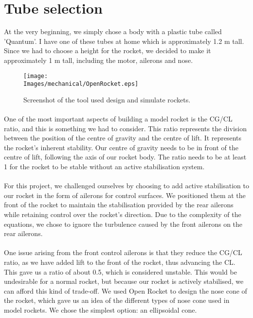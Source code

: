 \section{Tube selection}
At the very beginning, we simply chose a body with a plastic tube called 'Quantum'.
I have one of these tubes at home which is approximately 1.2 m tall. Since we had
to choose a height for the rocket, we decided to make it approximately 1 m tall,
including the motor, ailerons and nose.

\begin{figure}[!hbt]
    \centering
    \texttt{[image: \\Images/mechanical/OpenRocket.eps]}
    \caption{Screenshot of the tool used design and simulate rockets.}
\end{figure}
\FloatBarrier

\paragraph{}
One of the most important aspects of building a model rocket is the CG/CL ratio,
and this is something we had to consider. This ratio represents the division between
the position of the centre of gravity and the centre of lift. It represents the
rocket's inherent stability. Our centre of gravity needs to be in front of the
centre of lift, following the axis of our rocket body. The ratio needs to be at
least 1 for the rocket to be stable without an active stabilisation system.

\paragraph{}
For this project, we challenged ourselves by choosing to add active stabilisation
to our rocket in the form of ailerons for control surfaces. We positioned them at
the front of the rocket to maintain the stabilisation provided by the rear ailerons
while retaining control over the rocket's direction. Due to the complexity of the
equations, we chose to ignore the turbulence caused by the front ailerons on the
rear ailerons.

\paragraph{}
One issue arising from the front control ailerons is that they reduce the CG/CL
ratio, as we have added lift to the front of the rocket, thus advancing the CL.
This gave us a ratio of about 0.5, which is considered unstable. This would be
undesirable for a normal rocket, but because our rocket is actively stabilised,
we can afford this kind of trade-off.
We used Open Rocket to design the nose cone of the rocket, which gave us an idea
of the different types of nose cone used in model rockets. We chose the simplest
option: an ellipsoidal cone.

